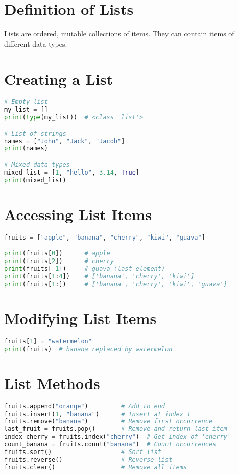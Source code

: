 \section{Definition of Lists}

Lists are ordered, mutable collections of items.  
They can contain items of different data types.

\section{Creating a List}

\begin{lstlisting}[language=Python]
# Empty list
my_list = []
print(type(my_list))  # <class 'list'>

# List of strings
names = ["John", "Jack", "Jacob"]
print(names)

# Mixed data types
mixed_list = [1, "hello", 3.14, True]
print(mixed_list)
\end{lstlisting}

\section{Accessing List Items}

\begin{lstlisting}[language=Python]
fruits = ["apple", "banana", "cherry", "kiwi", "guava"]

print(fruits[0])      # apple
print(fruits[2])      # cherry
print(fruits[-1])     # guava (last element)
print(fruits[1:4])    # ['banana', 'cherry', 'kiwi']
print(fruits[1:])     # ['banana', 'cherry', 'kiwi', 'guava']
\end{lstlisting}

\section{Modifying List Items}

\begin{lstlisting}[language=Python]
fruits[1] = "watermelon"
print(fruits)  # banana replaced by watermelon
\end{lstlisting}

\section{List Methods}

\begin{lstlisting}[language=Python]
fruits.append("orange")         # Add to end
fruits.insert(1, "banana")      # Insert at index 1
fruits.remove("banana")         # Remove first occurrence
last_fruit = fruits.pop()       # Remove and return last item
index_cherry = fruits.index("cherry")  # Get index of 'cherry'
count_banana = fruits.count("banana")  # Count occurrences
fruits.sort()                   # Sort list
fruits.reverse()                # Reverse list
fruits.clear()                  # Remove all items
\end{lstlisting}

